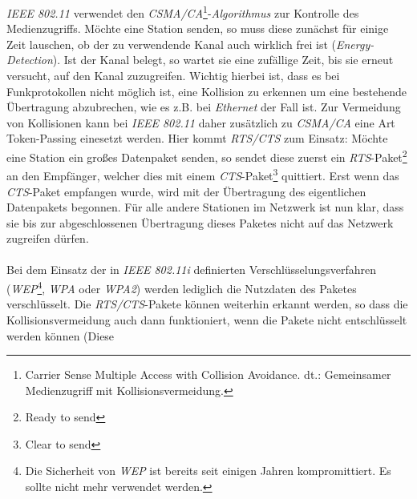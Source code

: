             \emph{IEEE 802.11} verwendet den \emph{CSMA/CA}\footnote{Carrier Sense Multiple Access with 
            Collision Avoidance. dt.: Gemeinsamer Medienzugriff mit Kollisionsvermeidung.}-\emph{Algorithmus}
            zur Kontrolle des Medienzugriffs. Möchte eine Station senden, so muss diese zunächst
            für einige Zeit lauschen, ob der zu verwendende Kanal auch wirklich frei ist
            (\emph{Energy-Detection}).
            Ist der Kanal belegt, so wartet sie eine zufällige Zeit, bis sie erneut versucht,
            auf den Kanal zuzugreifen. Wichtig hierbei ist, dass es bei Funkprotokollen nicht
            möglich ist, eine Kollision zu erkennen um eine bestehende Übertragung abzubrechen,
            wie es z.B. bei \textsl{Ethernet} der Fall ist. Zur Vermeidung von Kollisionen
            kann bei \emph{IEEE 802.11} daher zusätzlich zu \emph{CSMA/CA} eine Art Token-Passing einesetzt
            werden. Hier kommt \emph{RTS/CTS} zum Einsatz: Möchte eine Station ein großes Datenpaket
            senden, so sendet diese zuerst ein \emph{RTS}-Paket\footnote{Ready to send} an den Empfänger, 
            welcher dies mit einem \emph{CTS}-Paket\footnote{Clear to send} quittiert. Erst wenn das
            \emph{CTS}-Paket empfangen wurde, wird mit der Übertragung des eigentlichen Datenpakets
            begonnen. Für alle andere Stationen im Netzwerk ist nun klar, dass sie bis zur
            abgeschlossenen Übertragung dieses Paketes nicht auf das Netzwerk zugreifen
            dürfen.\\
            \\
            Bei dem Einsatz der in \emph{IEEE 802.11i} definierten Verschlüsselungsverfahren
            (\emph{WEP}\footnote{Die Sicherheit von \emph{WEP} ist bereits seit einigen Jahren
             kompromittiert. Es sollte nicht mehr verwendet werden.}, \emph{WPA} oder \emph{WPA2}) werden 
            lediglich die Nutzdaten des Paketes verschlüsselt. Die \emph{RTS/CTS}-Pakete können
            weiterhin erkannt werden, so dass die Kollisionsvermeidung auch dann
            funktioniert, wenn die Pakete nicht entschlüsselt werden können (Diese 
